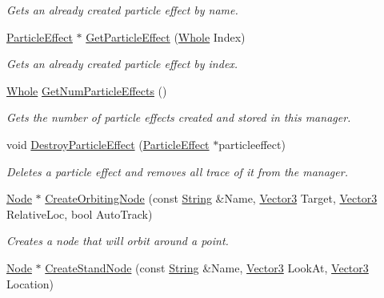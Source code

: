 \begin{DoxyCompactItemize}
\begin{DoxyCompactList}\small\item\em Gets an already created particle effect by name. \item\end{DoxyCompactList}\item 
\hyperlink{classphys_1_1ParticleEffect}{ParticleEffect} $\ast$ \hyperlink{classphys_1_1SceneManager_ae8508d38b670e4d2d16ee1f5a95dc29b}{GetParticleEffect} (\hyperlink{namespacephys_a460f6bc24c8dd347b05e0366ae34f34a}{Whole} Index)
\begin{DoxyCompactList}\small\item\em Gets an already created particle effect by index. \item\end{DoxyCompactList}\item 
\hyperlink{namespacephys_a460f6bc24c8dd347b05e0366ae34f34a}{Whole} \hyperlink{classphys_1_1SceneManager_a1d3c320cf0578c2e09dc488f95ed88e2}{GetNumParticleEffects} ()
\begin{DoxyCompactList}\small\item\em Gets the number of particle effects created and stored in this manager. \item\end{DoxyCompactList}\item 
void \hyperlink{classphys_1_1SceneManager_addce8f82a6758db345568dbd4a88f5b9}{DestroyParticleEffect} (\hyperlink{classphys_1_1ParticleEffect}{ParticleEffect} $\ast$particleeffect)
\begin{DoxyCompactList}\small\item\em Deletes a particle effect and removes all trace of it from the manager. \item\end{DoxyCompactList}\item 
\hyperlink{classphys_1_1Node}{Node} $\ast$ \hyperlink{classphys_1_1SceneManager_a8cbdbb737592fe10fb7f82e0eabf7085}{CreateOrbitingNode} (const \hyperlink{namespacephys_aa03900411993de7fbfec4789bc1d392e}{String} \&Name, \hyperlink{classphys_1_1Vector3}{Vector3} Target, \hyperlink{classphys_1_1Vector3}{Vector3} RelativeLoc, bool AutoTrack)
\begin{DoxyCompactList}\small\item\em Creates a node that will orbit around a point. \item\end{DoxyCompactList}\item 
\hyperlink{classphys_1_1Node}{Node} $\ast$ \hyperlink{classphys_1_1SceneManager_a07f3ee064d412908e14a3fe577d6ac80}{CreateStandNode} (const \hyperlink{namespacephys_aa03900411993de7fbfec4789bc1d392e}{String} \&Name, \hyperlink{classphys_1_1Vector3}{Vector3} LookAt, \hyperlink{classphys_1_1Vector3}{Vector3} Location)

\end{DoxyCompactItemize}
